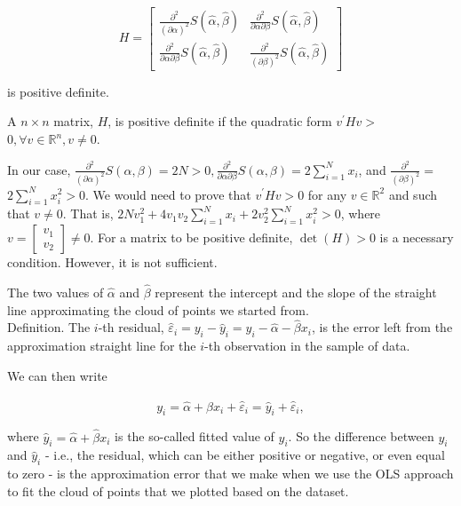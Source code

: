 $$
H=\left[\begin{array}{cc}
\frac{\partial^{2}}{(\partial \alpha)^{2}} S(\widehat{\alpha}, \widehat{\beta}) & \frac{\partial^{2}}{\partial \alpha \partial \beta} S(\widehat{\alpha}, \widehat{\beta}) \\
\frac{\partial^{2}}{\partial \alpha \partial \beta} S(\widehat{\alpha}, \widehat{\beta}) & \frac{\partial^{2}}{(\partial \beta)^{2}} S(\widehat{\alpha}, \widehat{\beta})
\end{array}\right]
$$

is positive definite.

\begin{definition}
A $n \times n$ matrix, $H$, is positive definite if the quadratic form $v^{\prime} H v>$ $0, \forall v \in \mathbb{R}^{n}, v \neq 0$.
\end{definition}

In our case, $\frac{\partial^{2}}{(\partial \alpha)^{2}} S(\alpha, \beta)=2 N>0, \frac{\partial^{2}}{\partial \alpha \partial \beta} S(\alpha, \beta)=2 \sum_{i=1}^{N} x_{i}$, and $\frac{\partial^{2}}{(\partial \beta)^{2}}=$ $2 \sum_{i=1}^{N} x_{i}^{2}>0$. We would need to prove that $v^{\prime} H v>0$ for any $v \in \mathbb{R}^{2}$ and such that $v \neq 0$. That is, $2 N v_{1}^{2}+4 v_{1} v_{2} \sum_{i=1}^{N} x_{i}+2 v_{2}^{2} \sum_{i=1}^{N} x_{i}^{2}>0$, where $v=\left[\begin{array}{l}v_{1} \\ v_{2}\end{array}\right] \neq 0$. For a matrix to be positive definite, $\operatorname{det}(H)>0$ is a necessary condition. However, it is not sufficient.

The two values of $\widehat{\alpha}$ and $\widehat{\beta}$ represent the intercept and the slope of the straight line approximating the cloud of points we started from.\\
Definition. The $i$-th residual, $\widehat{\varepsilon}_{i}=y_{i}-\widehat{y}_{i}=y_{i}-\widehat{\alpha}-\widehat{\beta} x_{i}$, is the error left from the approximation straight line for the $i$-th observation in the sample of data.

We can then write

$$
y_{i}=\widehat{\alpha}+\widehat{\beta} x_{i}+\widehat{\varepsilon}_{i}=\widehat{y}_{i}+\widehat{\varepsilon}_{i},
$$

where $\widehat{y}_{i}=\widehat{\alpha}+\widehat{\beta} x_{i}$ is the so-called fitted value of $y_{i}$. So the difference between $y_{i}$ and $\widehat{y}_{i}$ - i.e., the residual, which can be either positive or negative, or even equal to zero - is the approximation error that we make when we use the OLS approach to fit the cloud of points that we plotted based on the dataset.

